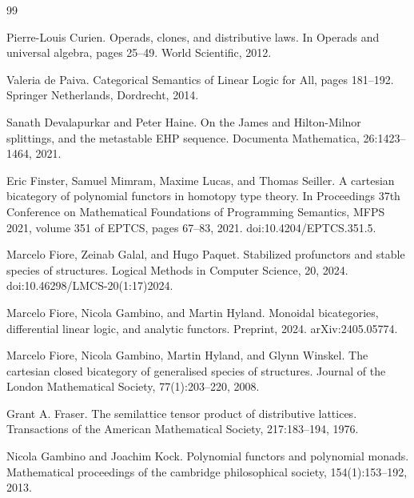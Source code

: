 \documentclass[10pt,a4paper]{article}
\begin{document}
\begin{thebibliography}{99}
\par\noindent    Pierre-Louis Curien.  Operads, clones, and distributive laws.  In Operads and universal algebra, pages 25–49. World Scientific, 2012.  

\par\noindent    Valeria de Paiva.  Categorical Semantics of Linear Logic for All, pages 181–192.  Springer Netherlands, Dordrecht, 2014.  

\par\noindent    Sanath Devalapurkar and Peter Haine.  On the James and Hilton-Milnor splittings, and the metastable EHP sequence.  Documenta Mathematica, 26:1423–1464, 2021.  

\par\noindent    Eric Finster, Samuel Mimram, Maxime Lucas, and Thomas Seiller.  A cartesian bicategory of polynomial functors in homotopy type theory.  In Proceedings 37th Conference on Mathematical Foundations of Programming Semantics, MFPS 2021, volume 351 of EPTCS, pages 67–83, 2021.  doi:10.4204/EPTCS.351.5.  

\par\noindent    Marcelo Fiore, Zeinab Galal, and Hugo Paquet.  Stabilized profunctors and stable species of structures.  Logical Methods in Computer Science, 20, 2024.  doi:10.46298/LMCS-20(1:17)2024.  

\par\noindent    Marcelo Fiore, Nicola Gambino, and Martin Hyland.  Monoidal bicategories, differential linear logic, and analytic functors.  Preprint, 2024.  arXiv:2405.05774.  

\par\noindent    Marcelo Fiore, Nicola Gambino, Martin Hyland, and Glynn Winskel.  The cartesian closed bicategory of generalised species of structures.  Journal of the London Mathematical Society, 77(1):203–220, 2008.  

\par\noindent    Grant A. Fraser.  The semilattice tensor product of distributive lattices.  Transactions of the American Mathematical Society, 217:183–194, 1976.  

\par\noindent    Nicola Gambino and Joachim Kock.  Polynomial functors and polynomial monads.  Mathematical proceedings of the cambridge philosophical society, 154(1):153–192, 2013.  


\end{thebibliography}
\end{document}
